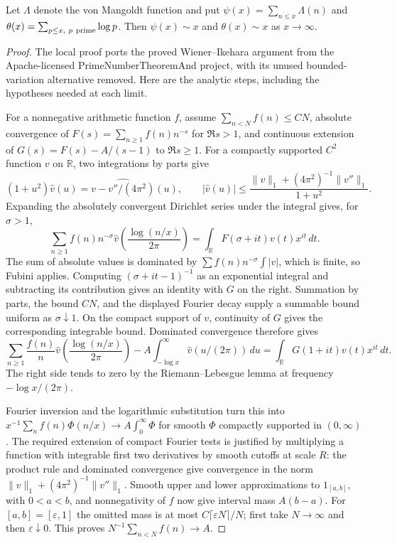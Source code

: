 \begin{lemma}
\label{construction:prime-number-theorem}
\leanok
Let $\Lambda$ denote the von Mangoldt function and put
$\psi(x)=\sum_{n\le x}\Lambda(n)$ and
$\theta(x)=\sum_{p\le x,\ p\ {\rm prime}}\log p$.
Then $\psi(x)\sim x$ and $\theta(x)\sim x$ as $x\to\infty$.
\end{lemma}
\begin{proof}
The local proof ports the proved Wiener--Ikehara argument from the
Apache-licensed PrimeNumberTheoremAnd project, with its unused
bounded-variation alternative removed.  Here are the analytic steps,
including the hypotheses needed at each limit.

For a nonnegative arithmetic function $f$, assume
$\sum_{n<N}f(n)\le CN$, absolute convergence of
$F(s)=\sum_{n\ge1}f(n)n^{-s}$ for $\Re s>1$, and continuous extension of
$G(s)=F(s)-A/(s-1)$ to $\Re s\ge1$.
For a compactly supported $C^2$ function $v$ on $\mathbb R$, two
integrations by parts give
\[
 (1+u^2)\widehat v(u)=
 \widehat{v-v''/(4\pi^2)}(u),\qquad
 |\widehat v(u)|\le
 \frac{\|v\|_1+(4\pi^2)^{-1}\|v''\|_1}{1+u^2}.
\]
Expanding the absolutely convergent Dirichlet series under the integral
gives, for $\sigma>1$,
\[
 \sum_{n\ge1}f(n)n^{-\sigma}
   \widehat v\!\left(\frac{\log(n/x)}{2\pi}\right)
 =\int_{\mathbb R}F(\sigma+it)v(t)x^{it}\,dt.
\]
The sum of absolute values is dominated by
$\sum f(n)n^{-\sigma}\int|v|$, which is finite, so Fubini applies.
Computing $(\sigma+it-1)^{-1}$ as an exponential integral and subtracting
its contribution gives an identity with $G$ on the right.
Summation by parts, the bound $CN$, and the displayed Fourier decay
supply a summable bound uniform as $\sigma\downarrow1$.
On the compact support of $v$, continuity of $G$ gives the corresponding
integrable bound.  Dominated convergence therefore gives
\[
 \sum_{n\ge1}\frac{f(n)}n
   \widehat v\!\left(\frac{\log(n/x)}{2\pi}\right)
 -A\int_{-\log x}^{\infty}\widehat v(u/(2\pi))\,du
 =\int_{\mathbb R}G(1+it)v(t)x^{it}\,dt.
\]
The right side tends to zero by the Riemann--Lebesgue lemma at frequency
$-\log x/(2\pi)$.

Fourier inversion and the logarithmic substitution turn this into
$x^{-1}\sum_n f(n)\Phi(n/x)\to A\int_0^\infty\Phi$ for smooth $\Phi$
compactly supported in $(0,\infty)$.
The required extension of compact Fourier tests is justified by
multiplying a function with integrable first two derivatives by smooth
cutoffs at scale $R$: the product rule and dominated convergence give
convergence in the norm
$\|v\|_1+(4\pi^2)^{-1}\|v''\|_1$.
Smooth upper and lower approximations to $1_{[a,b]}$, with $0<a<b$,
and nonnegativity of $f$ now give interval mass $A(b-a)$.
For $[a,b]=[\varepsilon,1]$ the omitted mass is at most
$C\lceil\varepsilon N\rceil/N$; first take $N\to\infty$ and then
$\varepsilon\downarrow0$.  This proves
$N^{-1}\sum_{n<N}f(n)\to A$.


\end{proof}

